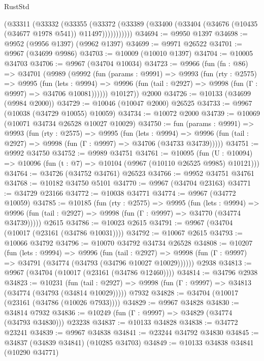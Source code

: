 \begin{lexlean}{RustStd}
\begin{coremodule}
          (@33311
            (@33332
              (@33355
                (@33372
                  (@33389 (@33400 (@33404 (@34676 (@10435 (@34677 @1978 @541)) @11497)))))))))))
@34694 := @9950 @1397
@34698 := @9952 (@9956 @1397) (@9962 @1397)
@34699 := @9971 @26522
@34701 := @9967 (@34699 @9986)
@34703 := @10009 (@10010 @1397)
@34704 := @10005 @34703
@34706 := @9967 (@34704 @10034)
@34723 := @9966
    (fun (fn : @86) =>
    @34701
      (@9989
        (@9992
          (fun (params : @9991) =>
          @9993
            (fun (rty : @2575) =>
            @9995
              (fun (lets : @9994) =>
              @9996 (fun (tail : @2927) => @9998 (fun (Γ : @9997) => @34706 @10081))))))
        @10127))
    @2000
@34726 := @10133 (@34699 (@9984 @2000))
@34729 := @10046 (@10047 @2000) @26525
@34733 := @9967 (@10038 (@34729 @10055) @10059)
@34734 := @10072 @2000
@34739 := @10069 (@10071 @34734 @26528 @10027 @10029)
@34750 := fun (params : @9991) =>
  @9993
    (fun (rty : @2575) =>
    @9995
      (fun (lets : @9994) =>
      @9996 (fun (tail : @2927) => @9998 (fun (Γ : @9997) => @34706 (@34733 @34739)))))
@34751 := @9992 @34750
@34752 := @9989 @34751
@34761 := @10095
    (fun (U : @10094) => @10096 (fun (t : @7) => @10104 (@9967 (@10110 @26525 @9985) @10121)))
@34764 := @34726 (@34752 @34761) @26523
@34766 := @9952 @34751 @34761
@34768 := @10182 @34750 @5101
@34770 := @9967 (@34704 @23163)
@34771 := @34729 @23166
@34772 := @10038 @34771
@34774 := @9967 (@34772 @10059)
@34785 := @10185
    (fun (rty : @2575) =>
    @9995
      (fun (lets : @9994) =>
      @9996 (fun (tail : @2927) => @9998 (fun (Γ : @9997) => @34770 (@34774 @34739)))))
    @2615
@34786 := @10023 @2615
@34791 := @9967 (@34704 (@10017 (@23161 (@34786 @10031))))
@34792 := @10067 @2615
@34793 := @10066 @34792
@34796 := @10070 @34792 @34734 @26528
@34808 := @10207
    (fun (lets : @9994) =>
    @9996
      (fun (tail : @2927) =>
      @9998 (fun (Γ : @9997) => @34791 (@34774 (@34793 (@34796 @10027 @10029))))))
    @2938
@34813 := @9967 (@34704 (@10017 (@23161 (@34786 @12460))))
@34814 := @34796 @2938
@34823 := @10231
    (fun (tail : @2927) => @9998 (fun (Γ : @9997) => @34813 (@34774 (@34793 (@34814 @10029)))))
    @7932
@34828 := @34704 (@10017 (@23161 (@34786 (@10026 @7933))))
@34829 := @9967 @34828
@34830 := @34814 @7932
@34836 := @10249 (fun (Γ : @9997) => @34829 (@34774 (@34793 @34830))) @23238
@34837 := @10133 @34828
@34838 := @34772 @23241
@34839 := @9967 @34838
@34841 := @23244 @34792 @34830
@34845 := @34837 (@34839 @34841) (@10285 @34703)
@34849 := @10133 @34838 @34841 (@10290 @34771)

\end{coremodule}
\end{lexlean}

